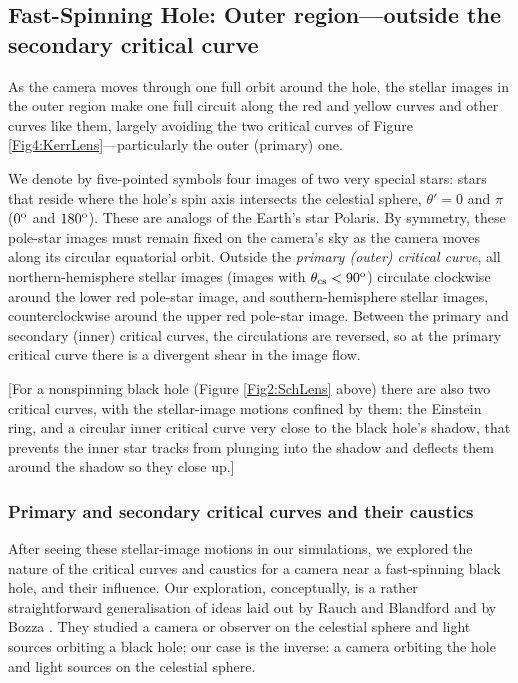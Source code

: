 \documentclass[12pt]{iopart}
\begin{document}
\subsection{Fast-Spinning Hole:  Outer region---outside the secondary critical curve}
\label{subsec:KerrOuter}


As the camera moves through one full orbit around the hole, the stellar images 
in the outer region make one full circuit along the red and yellow curves and other curves like them, 
largely avoiding the two critical curves of Figure \ref{Fig4:KerrLens}---particularly the outer (primary) one.

We denote by five-pointed symbols four images of two very special stars: stars that reside  where the hole's spin axis intersects the celestial sphere, $\theta'=0$ and $\pi$ ($0^{\rm o}$ and $180^{\rm o}$).  These are analogs of the Earth's star Polaris.  By symmetry, these pole-star images must remain fixed on the 
camera's sky as the camera moves along its circular equatorial orbit.  Outside
the \emph{primary (outer) critical curve}, all northern-hemisphere stellar images (images with $\theta_{\rm cs} < 90^{\rm o}$) circulate clockwise around the lower red pole-star image, and southern-hemisphere
stellar images, counterclockwise around the upper red pole-star image.  Between the primary and secondary (inner) critical curves,
the circulations are reversed, so at the primary critical curve there is a divergent shear in the image flow.

[For a nonspinning black hole (Figure \ref{Fig2:SchLens} above) there are also two critical curves, with the stellar-image motions confined by them: the Einstein ring, and a 
circular inner critical curve very close to the
black hole's shadow, that prevents the inner star tracks from plunging into the shadow and deflects them around the shadow so they close up.] 

\subsubsection{Primary and secondary critical curves and their caustics}
\label{subsec:KerrCaustics}

After seeing these stellar-image motions in our simulations, we explored the nature of the critical
curves and caustics for a camera near a fast-spinning black hole, and their influence.  Our exploration, conceptually, is a rather 
straightforward
generalisation of ideas laid out by Rauch and Blandford \cite{Rauch94} and by
Bozza \cite{Bozza08}.  They studied
a camera or observer on the celestial sphere and light sources orbiting a black hole;
our case is the inverse: a camera orbiting the hole and light sources on the celestial 
sphere.  
\end{document}
